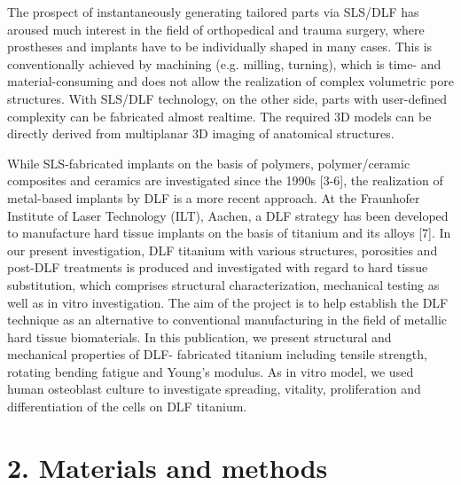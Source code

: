 \documentclass[10pt]{article}
\begin{document}
The prospect of instantaneously generating tailored parts via SLS/DLF has aroused much interest in the field of orthopedical and trauma surgery, where prostheses and implants have to be individually shaped in many cases. This is conventionally achieved by machining (e.g. milling, turning), which is time- and material-consuming and does not allow the realization of complex volumetric pore structures. With SLS/DLF technology, on the other side, parts with user-defined complexity can be fabricated almost realtime. The required 3D models can be directly derived from multiplanar 3D imaging of anatomical structures.

While SLS-fabricated implants on the basis of polymers, polymer/ceramic composites and ceramics are investigated since the 1990s [3-6], the realization of metal-based implants by DLF is a more recent approach. At the Fraunhofer Institute of Laser Technology (ILT), Aachen, a DLF strategy has been developed to manufacture hard tissue implants on the basis of titanium and its alloys [7]. In our present investigation, DLF titanium with various structures, porosities and post-DLF treatments is produced and investigated with regard to hard tissue substitution, which comprises structural characterization, mechanical testing as well as in vitro investigation. The aim of the project is to help establish the DLF technique as an alternative to conventional manufacturing in the field of metallic hard tissue biomaterials. In this publication, we present structural and mechanical properties of DLF- fabricated titanium including tensile strength, rotating bending fatigue and Young's modulus. As in vitro model, we used human osteoblast culture to investigate spreading, vitality, proliferation and differentiation of the cells on DLF titanium.

\section*{2. Materials and methods}
\end{document}
